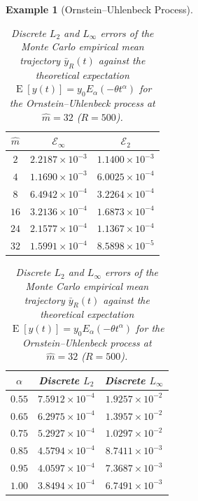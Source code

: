 \documentclass[11pt, a4paper]{article}
\theoremstyle{theoremstyle}
\theoremstyle{definitionstyle}
\newtheorem{example}[theorem]{Example}
\DeclareMathOperator{\EE}{\mathrm E}
\begin{document}
\begin{example}[Ornstein--Uhlenbeck Process]
\begin{enumerate}
    \begin{table}[htbp]
    \centering
    \begin{minipage}[t]{0.48\textwidth}
    \centering
    \caption{Trajectory errors $\mathcal E_\infty$ and $\mathcal E_2$ for the Ornstein--Uhlenbeck process at $\alpha = 1.0$ across degrees $\hat{m}$ ($R = 500$ sample paths, $N^* = 65{,}536$).}
    \label{tab:exp2_ou_stochastic_mse}
    \begin{tabular}{ccc}
    \toprule
    $\hat{m}$ & $\mathcal E_\infty$ & $\mathcal E_2$ \\
    \midrule
    $2$  & $2.2187 \times 10^{-3}$ & $1.1400 \times 10^{-3}$ \\
    $4$  & $1.1690 \times 10^{-3}$ & $6.0025 \times 10^{-4}$ \\
    $8$  & $6.4942 \times 10^{-4}$ & $3.2264 \times 10^{-4}$ \\
    $16$ & $3.2136 \times 10^{-4}$ & $1.6873 \times 10^{-4}$ \\
    $24$ & $2.1577 \times 10^{-4}$ & $1.1367 \times 10^{-4}$ \\
    $32$ & $1.5991 \times 10^{-4}$ & $8.5898 \times 10^{-5}$ \\
    \bottomrule
    \end{tabular}
    \end{minipage}
    \hfill
    \begin{minipage}[t]{0.48\textwidth}
    \centering
    \caption{Discrete $L_2$ and $L_\infty$ errors of the Monte Carlo empirical mean trajectory $\bar{y}_R(t)$ against the theoretical expectation $\EE[y(t)] = y_0 E_\alpha(-\theta t^\alpha)$ for the Ornstein--Uhlenbeck process at $\hat{m} = 32$ ($R = 500$).}
    \label{tab:exp2_ou_mean_error}
    \begin{tabular}{ccc}
    \toprule
    $\alpha$ & Discrete $L_2$ & Discrete $L_\infty$ \\
    \midrule
    $0.55$ & $7.5912 \times 10^{-4}$ & $1.9257 \times 10^{-2}$ \\
    $0.65$ & $6.2975 \times 10^{-4}$ & $1.3957 \times 10^{-2}$ \\
    $0.75$ & $5.2927 \times 10^{-4}$ & $1.0297 \times 10^{-2}$ \\
    $0.85$ & $4.5794 \times 10^{-4}$ & $8.7411 \times 10^{-3}$ \\
    $0.95$ & $4.0597 \times 10^{-4}$ & $7.3687 \times 10^{-3}$ \\
    $1.00$ & $3.8494 \times 10^{-4}$ & $6.7491 \times 10^{-3}$ \\
    \bottomrule
    \end{tabular}
    \end{minipage}
    \end{table}


\end{enumerate}
\end{example}
\end{document}
